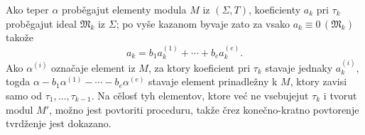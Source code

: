 \documentclass[11pt]{article}
\newcommand{\ideal}[1]{\mathfrak{#1}}
\newcommand{\eqzero}[1]{\equiv 0\,(#1)}
\begin{document}
Ako teper \(\alpha\) proběgajut elementy modula \(M\) iz \((\Sigma,T)\), koeficienty \(a_k\) pri \(\tau_k\) proběgajut ideal \(\ideal M_k\) iz \(\Sigma\); po vyše kazanom byvaje zato za vsako \(a_k\eqzero{\ideal M_k}\) takože
\[
 a_k=b_1a_k^{(1)}+\cdots+b_ea_k^{(e)}.
\]
Ako \(\alpha^{(i)}\) označaje element iz \(M\), za ktory koeficient pri \(\tau_k\) stavaje jednaky \(a_k^{(i)}\), togda \(\alpha-b_1\alpha^{(1)}-\cdots-b_e\alpha^{(e)}\) stavaje element prinadležny k \(M\), ktory zavisi samo od \(\tau_1,\ldots,\tau_{k-1}\). Na cělosť tyh elementov, ktore već ne vsebujejut \(\tau_k\) i tvorut modul \(M'\), možno jest povtoriti proceduru, takže črez konečno-kratno povtorenje tvrdženje jest dokazano.
\end{document}
